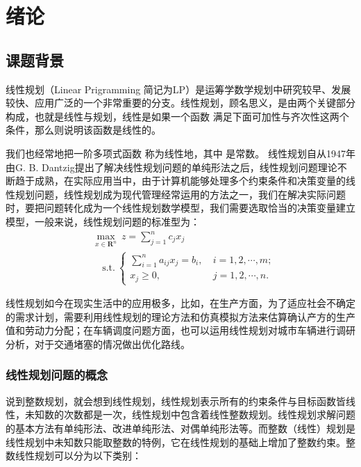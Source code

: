 	{\centering\chapter{绪论}}
	\setlength{\baselineskip}{20pt}

	
	\section{课题背景}
	
线性规划\cite{yangchang2014integer}（Linear Prigramming 简记为LP）是运筹学数学规划中研究较早、发展较快、应用广泛的一个非常重要的分支。线性规划，顾名思义，是由两个关键部分构成，也就是线性与规划，线性是如果一个函数  满足下面可加性与齐次性这两个条件，那么则说明该函数是线性的。
  
  
我们也经常地把一阶多项式函数  称为线性地，其中 是常数。
线性规划自从1947年由G. B. Dantzig提出了解决线性规划问题的单纯形法之后，线性规划问题理论不断趋于成熟，在实际应用当中，由于计算机能够处理多个约束条件和决策变量的线性规划问题，线性规划成为现代管理经常运用的方法之一，我们在解决实际问题时，要把问题转化成为一个线性规划数学模型，我们需要选取恰当的决策变量建立模型，一般来说，线性规划问题的标准型为：
	\begin{equation*}
		\begin{split}
			&\max_{x \in \mathbf{R}^{n}}~z = \sum_{j=1}^{n}c_j x_j \\
			& \quad \text{s.t.} ~
				\begin{cases}
					\sum_{i=1}^{n} a_{ij} x_j = b_i, ~&i = 1, 2, \cdots, m; \\
					x_j \geq 0, ~&j = 1, 2, \cdots, n.
				\end{cases}
		\end{split}
	\end{equation*}

线性规划如今在现实生活中的应用极多，比如，在生产方面，为了适应社会不确定的需求计划，需要利用线性规划的理论方法和仿真模拟方法来估算确认产方的生产值和劳动力分配；在车辆调度问题方面，也可以运用线性规划对城市车辆进行调研分析，对于交通堵塞的情况做出优化路线。

	
	\subsection{线性规划问题的概念}
	
	说到整数规划\cite{ywy2022}，就会想到线性规划，线性规划表示所有的约束条件与目标函数皆线性，未知数的次数都是一次，线性规划中包含着线性整数规划。线性规划求解问题的基本方法有单纯形法、改进单纯形法、对偶单纯形法等。而整数（线性）规划是线性规划中未知数只能取整数的特例，它在线性规划的基础上增加了整数约束。整数线性规划可以分为以下类别：
	
